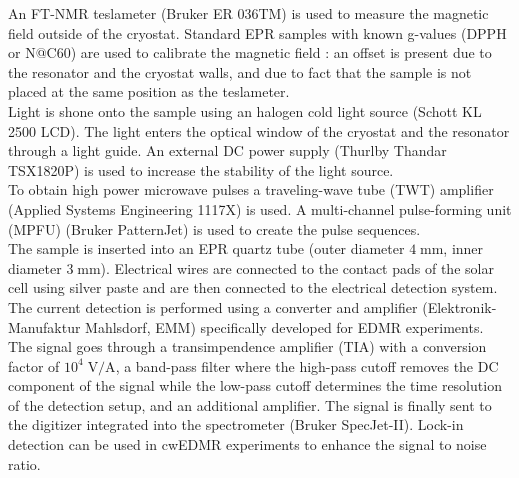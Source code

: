 \documentclass[a4paper]{book}
\begin{document}
	An FT-NMR teslameter (Bruker ER 036TM) is used to measure the magnetic field outside of the cryostat. Standard EPR samples with known g-values (DPPH or N@C60) are used to calibrate the magnetic field \cite{pfluegerEndohedralAtomicNitrogen2012}: an offset is present due to the resonator and the cryostat walls, and due to fact that the sample is not placed at the same position as the teslameter.\\
	Light is shone onto the sample using an halogen cold light source (Schott KL 2500 LCD). The light enters the optical window of the cryostat and the resonator through a light guide. An external DC power supply (Thurlby Thandar TSX1820P) is used to increase the stability of the light source.\\
	To obtain high power microwave pulses a traveling-wave tube (TWT) amplifier (Applied Systems Engineering 1117X) is used. A multi-channel pulse-forming unit (MPFU) (Bruker PatternJet) is used to create the pulse sequences.\\
	The sample is inserted into an EPR quartz tube (outer diameter $4 \; \text{mm}$, inner diameter $3 \; \text{mm}$). Electrical wires are connected to the contact pads of the solar cell using silver paste and are then connected to the electrical detection system. \\
	The current detection is performed using a converter and amplifier (Elektronik-Manufaktur Mahlsdorf, EMM) specifically developed for EDMR experiments. The signal goes through a transimpendence amplifier (TIA) with a conversion factor of $10^4 \; \text{V/A}$, a band-pass filter where the high-pass cutoff removes the DC component of the signal while the low-pass cutoff determines the time resolution of the detection setup, and an additional amplifier. The signal is finally sent to the digitizer integrated into the spectrometer (Bruker SpecJet-II). Lock-in detection can be used in cwEDMR experiments to enhance the signal to noise ratio.\\
	
\end{document}
